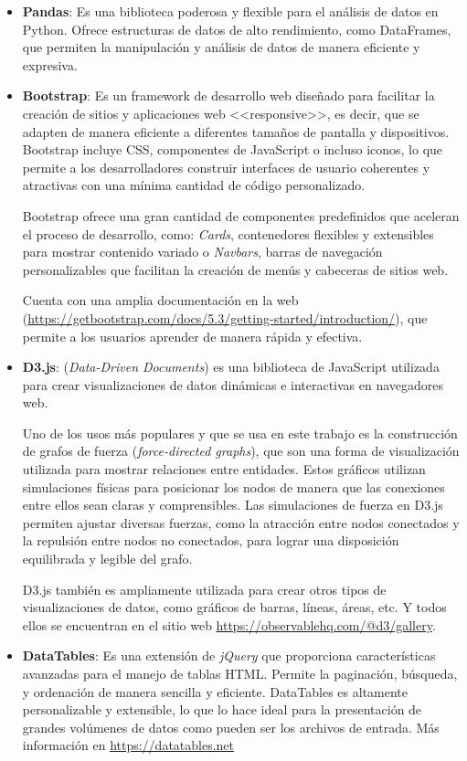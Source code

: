 \begin{itemize}
	\item \textbf{Pandas}: Es una biblioteca poderosa y flexible para el análisis de datos en Python. Ofrece estructuras de datos de alto rendimiento, como DataFrames, que permiten la manipulación y análisis de datos de manera eficiente y expresiva.
	\item \textbf{Bootstrap}: Es un framework de desarrollo web diseñado para facilitar la creación de sitios y aplicaciones web <<responsive>>, es decir, que se adapten de manera eficiente a diferentes tamaños de pantalla y dispositivos. Bootstrap incluye CSS, componentes de JavaScript o incluso iconos, lo que permite a los desarrolladores construir interfaces de usuario coherentes y atractivas con una mínima cantidad de código personalizado.
	
	Bootstrap ofrece una gran cantidad de componentes predefinidos que aceleran el proceso de desarrollo, como: \textit{Cards}, contenedores flexibles y extensibles para mostrar contenido variado o \textit{Navbars}, barras de navegación personalizables que facilitan la creación de menús y cabeceras de sitios web.
	
	Cuenta con una amplia documentación en la web (\url{https://getbootstrap.com/docs/5.3/getting-started/introduction/}), que permite a los usuarios aprender de manera rápida y efectiva.
	\item \textbf{D3.js}: (\textit{Data-Driven Documents}) es una biblioteca de JavaScript utilizada para crear visualizaciones de datos dinámicas e interactivas en navegadores web.
	
	Uno de los usos más populares y que se usa en este trabajo es la construcción de grafos de fuerza (\textit{force-directed graphs}), que son una forma de visualización utilizada para mostrar relaciones entre entidades. Estos gráficos utilizan simulaciones físicas para posicionar los nodos de manera que las conexiones entre ellos sean claras y comprensibles. Las simulaciones de fuerza en D3.js permiten ajustar diversas fuerzas, como la atracción entre nodos conectados y la repulsión entre nodos no conectados, para lograr una disposición equilibrada y legible del grafo.
	
	D3.js también es ampliamente utilizada para crear otros tipos de visualizaciones de datos, como gráficos de barras, líneas, áreas, etc. Y todos ellos se encuentran en el sitio web \url{https://observablehq.com/@d3/gallery}.
	\item \textbf{DataTables}: Es una extensión de \textit{jQuery} que proporciona características avanzadas para el manejo de tablas HTML. Permite la paginación, búsqueda, y ordenación de manera sencilla y eficiente. DataTables es altamente personalizable y extensible, lo que lo hace ideal para la presentación de grandes volúmenes de datos como pueden ser los archivos de entrada. Más información en \url{https://datatables.net}
	
\end{itemize}
